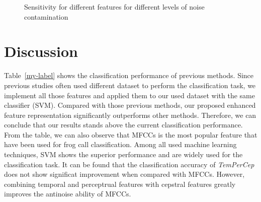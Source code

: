 \begin{figure}[htb!] %
\caption{Sensitivity for different features for different levels of noise contamination}
\label{diffNoise} 
\end{figure}


\section{Discussion}
Table~\ref{my-label} shows the classification performance of previous methods. Since previous studies often used different dataset to perform the classification task, we implement all those features and applied them to our used dataset with the same classifier (SVM). Compared with those previous methods, our proposed enhanced feature representation significantly outperforms other methods. Therefore, we can conclude that our results stands above the current classification performance. From the table, we can also observe that MFCCs is the most popular feature that have been used for frog call classification. Among all used machine learning techniques, SVM shows the superior performance and are widely used for the classification task. It can be found that the classification accuracy of \textit{TemPerCep} does not show significat improvement when compared with MFCCs. However, combining temporal and perceptrual features with cepstral features greatly improves the antinoise ability of MFCCs.

